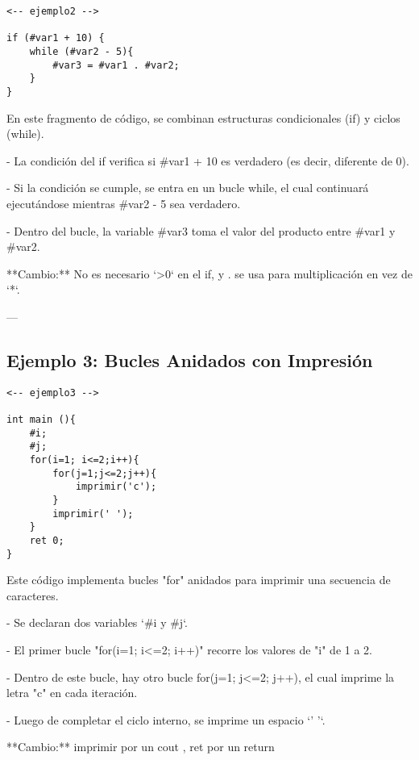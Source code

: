 \documentclass{article}
\begin{document}
\begin{verbatim}
<-- ejemplo2 -->

if (#var1 + 10) {
    while (#var2 - 5){
        #var3 = #var1 . #var2;
    }
}
\end{verbatim}

En este fragmento de código, se combinan estructuras condicionales (if) y ciclos (while).  

- La condición del if verifica si #var1 + 10 es verdadero (es decir, diferente de 0).  

- Si la condición se cumple, se entra en un bucle while, el cual continuará ejecutándose mientras #var2 - 5 sea verdadero.  

- Dentro del bucle, la variable #var3 toma el valor del producto entre #var1 y #var2.  

**Cambio:** No es necesario `\textgreater 0` en el if, y . se usa para multiplicación en vez de `*`.  

---

\subsection{Ejemplo 3: Bucles Anidados con Impresión}

\begin{verbatim}
<-- ejemplo3 -->

int main (){
    #i;
    #j;
    for(i=1; i<=2;i++){
        for(j=1;j<=2;j++){
            imprimir('c');
        }
        imprimir(' ');
    }
    ret 0;
}
\end{verbatim}

Este código implementa bucles "for" anidados para imprimir una secuencia de caracteres.  

- Se declaran dos variables `#i y #j`.  

- El primer bucle "for(i=1; i<=2; i++)" recorre los valores de "i" de 1 a 2.  

- Dentro de este bucle, hay otro bucle for(j=1; j<=2; j++), el cual imprime la letra "c" en cada iteración.  

- Luego de completar el ciclo interno, se imprime un espacio `' '`.  

**Cambio:** imprimir por un cout , ret por un return 
\end{document}
